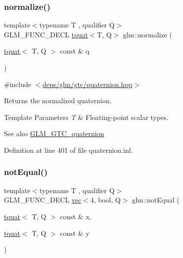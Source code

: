 \subsubsection{\texorpdfstring{normalize()}{normalize()}}
{\footnotesize\ttfamily template$<$typename T , qualifier Q$>$ \\
G\+L\+M\+\_\+\+F\+U\+N\+C\+\_\+\+D\+E\+CL \hyperlink{structglm_1_1tquat}{tquat}$<$T, Q$>$ glm\+::normalize (\begin{DoxyParamCaption}\item[{\hyperlink{structglm_1_1tquat}{tquat}$<$ T, Q $>$ const \&}]{q }\end{DoxyParamCaption})}



{\ttfamily \#include $<$\hyperlink{gtc_2quaternion_8hpp}{deps/glm/gtc/quaternion.\+hpp}$>$}

Returns the normalized quaternion.


\begin{DoxyTemplParams}{Template Parameters}
{\em T} & Floating-\/point scalar types.\\
\hline
\end{DoxyTemplParams}
\begin{DoxySeeAlso}{See also}
\hyperlink{group__gtc__quaternion}{G\+L\+M\+\_\+\+G\+T\+C\+\_\+quaternion} 
\end{DoxySeeAlso}


Definition at line 401 of file quaternion.\+inl.

\mbox{\label{group__gtc__quaternion_ga9494ec3489041958a240963a8a0ac9a0}} 
\subsubsection{\texorpdfstring{not\+Equal()}{notEqual()}}
{\footnotesize\ttfamily template$<$typename T , qualifier Q$>$ \\
G\+L\+M\+\_\+\+F\+U\+N\+C\+\_\+\+D\+E\+CL \hyperlink{structglm_1_1vec}{vec}$<$4, bool, Q$>$ glm\+::not\+Equal (\begin{DoxyParamCaption}\item[{\hyperlink{structglm_1_1tquat}{tquat}$<$ T, Q $>$ const \&}]{x,  }\item[{\hyperlink{structglm_1_1tquat}{tquat}$<$ T, Q $>$ const \&}]{y }\end{DoxyParamCaption})}



